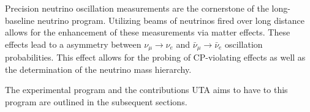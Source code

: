 \label{sec:IF_LBNProgram}
Precision neutrino oscillation measurements are the cornerstone of the long-baseline neutrino program. Utilizing beams of neutrinos fired over long distance allows for the enhancement of these measurements via matter effects. These effects lead to a asymmetry between $\nu_{\mu} \rightarrow \nu_{e}$ and $\bar{\nu}_{\mu} \rightarrow \bar{\nu}_{e}$ oscillation probabilities. This effect allows for the probing of CP-violating effects as well as the determination of the neutrino mass hierarchy. 

The experimental program and the contributions UTA aims to have to this program are outlined in the subsequent sections.
